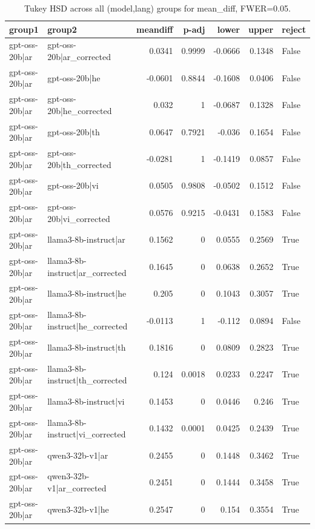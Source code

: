 \begin{table}
\caption{Tukey HSD across all (model,lang) groups for mean_diff, FWER=0.05.}
\label{tab:tukey_all_models_all_langs_mean_diff}
\begin{tabular}{l l r r r r l}
\toprule
group1 & group2 & meandiff & p-adj & lower & upper & reject \\
\midrule
gpt-oss-20b|ar & gpt-oss-20b|ar_corrected & 0.0341 & 0.9999 & -0.0666 & 0.1348 & False \\
gpt-oss-20b|ar & gpt-oss-20b|he & -0.0601 & 0.8844 & -0.1608 & 0.0406 & False \\
gpt-oss-20b|ar & gpt-oss-20b|he_corrected & 0.032 & 1 & -0.0687 & 0.1328 & False \\
gpt-oss-20b|ar & gpt-oss-20b|th & 0.0647 & 0.7921 & -0.036 & 0.1654 & False \\
gpt-oss-20b|ar & gpt-oss-20b|th_corrected & -0.0281 & 1 & -0.1419 & 0.0857 & False \\
gpt-oss-20b|ar & gpt-oss-20b|vi & 0.0505 & 0.9808 & -0.0502 & 0.1512 & False \\
gpt-oss-20b|ar & gpt-oss-20b|vi_corrected & 0.0576 & 0.9215 & -0.0431 & 0.1583 & False \\
gpt-oss-20b|ar & llama3-8b-instruct|ar & 0.1562 & 0 & 0.0555 & 0.2569 & True \\
gpt-oss-20b|ar & llama3-8b-instruct|ar_corrected & 0.1645 & 0 & 0.0638 & 0.2652 & True \\
gpt-oss-20b|ar & llama3-8b-instruct|he & 0.205 & 0 & 0.1043 & 0.3057 & True \\
gpt-oss-20b|ar & llama3-8b-instruct|he_corrected & -0.0113 & 1 & -0.112 & 0.0894 & False \\
gpt-oss-20b|ar & llama3-8b-instruct|th & 0.1816 & 0 & 0.0809 & 0.2823 & True \\
gpt-oss-20b|ar & llama3-8b-instruct|th_corrected & 0.124 & 0.0018 & 0.0233 & 0.2247 & True \\
gpt-oss-20b|ar & llama3-8b-instruct|vi & 0.1453 & 0 & 0.0446 & 0.246 & True \\
gpt-oss-20b|ar & llama3-8b-instruct|vi_corrected & 0.1432 & 0.0001 & 0.0425 & 0.2439 & True \\
gpt-oss-20b|ar & qwen3-32b-v1|ar & 0.2455 & 0 & 0.1448 & 0.3462 & True \\
gpt-oss-20b|ar & qwen3-32b-v1|ar_corrected & 0.2451 & 0 & 0.1444 & 0.3458 & True \\
gpt-oss-20b|ar & qwen3-32b-v1|he & 0.2547 & 0 & 0.154 & 0.3554 & True \\

\end{tabular}
\end{table}
